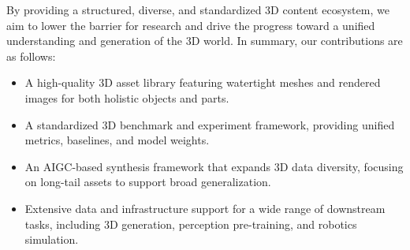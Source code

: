 \documentclass{article} %
\begin{document}
By providing a structured, diverse, and standardized 3D content ecosystem, we aim to lower the barrier for research and drive the progress toward a unified understanding and generation of the 3D world. In summary, our contributions are as follows:
\begin{itemize}
    \item A high-quality 3D asset library featuring watertight meshes and rendered images for both holistic objects and parts.
    \item A standardized 3D benchmark and experiment framework, providing unified metrics, baselines, and model weights.
    \item An AIGC-based synthesis framework that expands 3D data diversity, focusing on long-tail assets to support broad generalization.
    \item Extensive data and infrastructure support for a wide range of downstream tasks, including 3D generation, perception pre-training, and robotics simulation.
\end{itemize}



\end{document}
